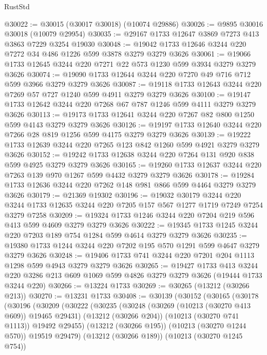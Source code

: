 \begin{lexlean}{RustStd}
\begin{coremodule}
{\begin{coremodule}
{{{{{{{{{{{{{{{{{{{{{{{{{{@30022 := @30015 (@30017 @30018) (@10074 @29886)
@30026 := @9895 @30016 @30018 (@10079 @29954)
@30035 := @29167 @1733 @12647 @3869 @7273 @413 @3863 @7229 @3254 @19030
@30048 := @19042 @1733 @12646 @3244 @220 @7272 @34 @486 @1226 @599 @3878 @3279 @3279 @3626
@30061 := @19066 @1733 @12645 @3244 @220 @7271 @22 @573 @1230 @599 @3934 @3279 @3279 @3626
@30074 := @19090 @1733 @12644 @3244 @220 @7270 @49 @716 @712 @599 @3966 @3279 @3279 @3626
@30087 := @19118 @1733 @12643 @3244 @220 @7269 @57 @727 @1240 @599 @4911 @3279 @3279 @3626
@30100 := @19147 @1733 @12642 @3244 @220 @7268 @67 @787 @1246 @599 @4111 @3279 @3279 @3626
@30113 := @19173 @1733 @12641 @3244 @220 @7267 @82 @800 @1250 @599 @4143 @3279 @3279 @3626
@30126 := @19197 @1733 @12640 @3244 @220 @7266 @28 @819 @1256 @599 @4175 @3279 @3279 @3626
@30139 := @19222 @1733 @12639 @3244 @220 @7265 @123 @842 @1260 @599 @4921 @3279 @3279 @3626
@30152 := @19242 @1733 @12638 @3244 @220 @7264 @131 @920 @838 @599 @4925 @3279 @3279 @3626
@30165 := @19260 @1733 @12637 @3244 @220 @7263 @139 @970 @1267 @599 @4432 @3279 @3279 @3626
@30178 := @19284 @1733 @12636 @3244 @220 @7262 @148 @981 @866 @599 @4464 @3279 @3279 @3626
@30179 := @21369 @19302
@30196 := @19032
    @30179
    @3244
    @220
    @3244
    @1733
    @12635
    @3244
    @220
    @7205
    @157
    @567
    @1277
    @1719
    @7249
    @7254
    @3279
    @7258
@30209 := @19324 @1733 @1246 @3244 @220 @7204 @219 @596 @413 @599 @4609 @3279 @3279 @3626
@30222 := @19345 @1733 @1245 @3244 @220 @7203 @189 @754 @1284 @599 @4614 @3279 @3279 @3626
@30235 := @19380 @1733 @1244 @3244 @220 @7202 @195 @570 @1291 @599 @4647 @3279 @3279 @3626
@30248 := @19406 @1733 @741 @3244 @220 @7201 @204 @1113 @1298 @599 @4943 @3279 @3279 @3626
@30265 := @19427
    @1733
    @413
    @3244
    @220
    @3286
    @213
    @609
    @1069
    @599
    @4826
    @3279
    @3279
    @3626
    (@19444 @1733 @3244 @220)
@30266 := @13224 @1733
@30269 := @30265 (@13212 (@30266 @213))
@30270 := @13231 @1733
@30408 := @30139
    (@30152
      (@30165
        (@30178
          (@30196
            (@30209
              (@30222
                (@30235
                  (@30248
                    (@30269 (@10213 (@30270 @413 @609)) @19465 @29431)
                    (@13212 (@30266 @204))
                    (@10213 (@30270 @741 @1113))
                    @19492
                    @29455)
                  (@13212 (@30266 @195))
                  (@10213 (@30270 @1244 @570))
                  @19519
                  @29479)
                (@13212 (@30266 @189))
                (@10213 (@30270 @1245 @754))
}}}}}}}}}}}}}}}}}}}}}}}}}}
\end{coremodule}}
\end{coremodule}
\end{lexlean}
